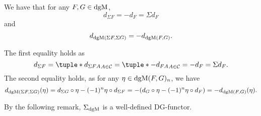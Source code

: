 \begin{remark}
    We have that for any \( F, G \in \operatorname{dgM} \),
    \[
        d_{\Sigma F} = -d_F = \Sigma d_F
    \]
    and
    \[
        d_{\operatorname{dgM}(\Sigma F, \Sigma G)} = - d_{\operatorname{dgM}(F, G)}.
    \]

    The first equality holds as
    \[
        d_{\Sigma F} = \tuple*{d_{\Sigma F A}}_{A \in \Cc} = \tuple*{-d_{F A}}_{A \in \Cc} = - d_F = \Sigma d_F.
    \]
    The second equality holds, as for any \( \eta \in \operatorname{dgM}(F, G)_n \), we have
    \[
        d_{\operatorname{dgM}(\Sigma F, \Sigma G)} (\eta) = d_{\Sigma G} \circ \eta - (-1)^n \eta \circ d_{\Sigma F} = - (d_G \circ \eta - (-1)^n \eta \circ d_F) = - d_{\operatorname{dgM}(F, G)} (\eta).
    \]
\end{remark}

By the following remark, \( \Sigma_{\operatorname{dgM}} \) is a well-defined DG-functor.

